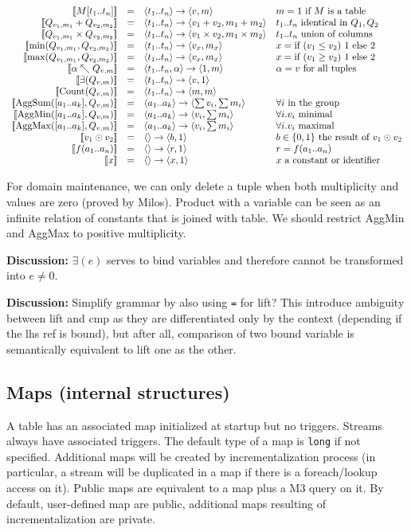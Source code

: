 \documentclass[10pt]{article}
\newlength{\dlen}
\def\discuss#1{\par\hspace{2em}
\setlength{\dlen}{\textwidth}
\addtolength{\dlen}{-2em}
\begin{minipage}{\dlen}\footnotesize {\bf\color{red} Discussion:} #1\end{minipage}\par}
\begin{document}
\newcommand\erule[4][t_1.. t_n]{\left[\![ #2 ]\!\right] &=& \langle#1\rangle\to \langle #3\rangle & #4\\}
\[\begin{array}{rcll}
\erule{M[t_1..t_n]}{v,m}{m=1 \text{ if $M$ is a table}}
\erule{Q_{v_1,m_1} + Q_{v_2,m_2}}{v_1+v_2,m_1+m_2}{t_1..t_n \text{ identical in } Q_1,Q_2}
\erule{Q_{v_1,m_1} \times Q_{v_2,m_2}}{v_1\times v_2,m_1\times m_2}{t_1..t_n \text{ union of columns}}
\erule{\min(Q_{v_1,m_1}, Q_{v_2,m_2})}{v_x,m_x}{x = \text{if ($v_1\le v_2$) 1 else 2}}
\erule{\max(Q_{v_1,m_1}, Q_{v_2,m_2})}{v_x,m_x}{x = \text{if ($v_1\ge v_2$) 1 else 2}}
\erule[t_1..t_n,\alpha]{\alpha\nwarrow Q_{v,m}}{1,m}{\alpha=v \text{ for all tuples}}
\erule{\exists(Q_{v,m})}{v,1}{}
\erule{{\rm Count}(Q_{v,m})}{m,m}{}
\erule[a_1..a_k]{{\rm AggSum}([a_1..a_k], Q_{v,m})}{\sum v_i,\sum m_i}{\forall i\text{ in the group}}
\erule[a_1..a_k]{{\rm AggMin}([a_1..a_k], Q_{v,m})}{v_i,\sum m_i}{\forall i. v_i\text{ minimal}}
\erule[a_1..a_k]{{\rm AggMax}([a_1..a_k], Q_{v,m})}{v_i,\sum m_i}{\forall i. v_i\text{ maximal}}
\erule[]{v_1 \odot v_2}{b,1}{b\in\{0,1\}\text{ the result of }v_1 \odot v_2}
\erule[]{f(a_1..a_n)}{r,1}{r=f(a_1..a_n)}
\erule[]{x}{x,1}{x \text{ a constant or identifier}}
\end{array}\]

For domain maintenance, we can only delete a tuple when both multiplicity and values are zero (proved by Milos). Product with a variable can be seen as an infinite relation of constants that is joined with table. We should restrict AggMin and AggMax to positive multiplicity.

\discuss{$\exists(e)$ serves to bind variables and therefore cannot be transformed into $e\ne 0$.}
\discuss{Simplify grammar by also using {\tt =} for lift? This introduce ambiguity between lift and cmp as they are differentiated only by the context (depending if the lhs ref is bound), but after all, comparison of two bound variable is semantically equivalent to lift one as the other.}

\subsection{Maps (internal structures)}
A table has an associated map initialized at startup but no triggers. Streams always have associated triggers. The default type of a map is {\tt long} if not specified. Additional maps will be created by incrementalization process (in particular, a stream will be duplicated in a map if there is a foreach/lookup access on it). Public maps are equivalent to a map plus a M3 query on it. By default, user-defined map are public, additional maps resulting of incrementalization are private.
\end{document}
